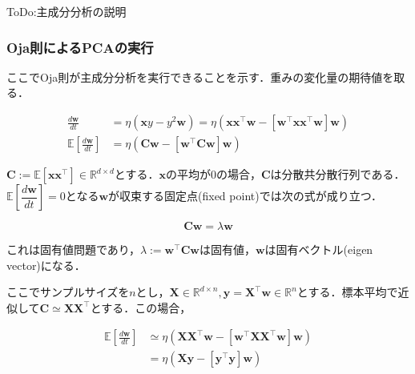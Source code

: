ToDo:主成分分析の説明




\subsubsection{Oja則によるPCAの実行}
ここでOja則が主成分分析を実行できることを示す．重みの変化量の期待値を取る．


\begin{align}
\frac{d\mathbf{w}}{dt} &= \eta \left(\mathbf{x}y - y^2 \mathbf{w}\right)=\eta \left(\mathbf{x}\mathbf{x}^\top \mathbf{w} - \left[\mathbf{w}^\top \mathbf{x}\mathbf{x}^\top \mathbf{w}\right] \mathbf{w}\right)\\
\mathbb{E}\left[\frac{d\mathbf{w}}{dt}\right] &= \eta \left(\mathbf{C} \mathbf{w} - \left[\mathbf{w}^\top \mathbf{C} \mathbf{w}\right] \mathbf{w}\right)
\end{align}


$\mathbf{C}:=\mathbb{E}[\mathbf{x}\mathbf{x}^\top]\in \mathbb{R}^{d\times d}$とする．$\mathbf{x}$の平均が0の場合，$\mathbf{C}$は分散共分散行列である．$\mathbb{E}\left[\dfrac{d\mathbf{w}}{dt}\right]=0$となる$\mathbf{w}$が収束する固定点(fixed point)では次の式が成り立つ．


\begin{equation}
\mathbf{C}\mathbf{w} = \lambda \mathbf{w}
\end{equation}


これは固有値問題であり，$\lambda:=\mathbf{w}^\top \mathbf{C} \mathbf{w}$は固有値，$\mathbf{w}$は固有ベクトル(eigen vector)になる．

ここでサンプルサイズを$n$とし，$\mathbf{X} \in \mathbb{R}^{d\times n}, \mathbf{y}=\mathbf{X}^\top\mathbf{w} \in \mathbb{R}^n$とする．標本平均で近似して$\mathbf{C}\simeq \mathbf{X}\mathbf{X}^\top$とする．この場合，


\begin{align}
\mathbb{E}\left[\frac{d\mathbf{w}}{dt}\right] &\simeq \eta \left(\mathbf{X}\mathbf{X}^\top \mathbf{w} - \left[\mathbf{w}^\top \mathbf{X}\mathbf{X}^\top \mathbf{w}\right] \mathbf{w}\right)\\
&=\eta \left(\mathbf{X}\mathbf{y} - \left[\mathbf{y}^\top\mathbf{y}\right] \mathbf{w}\right)
\end{align}


